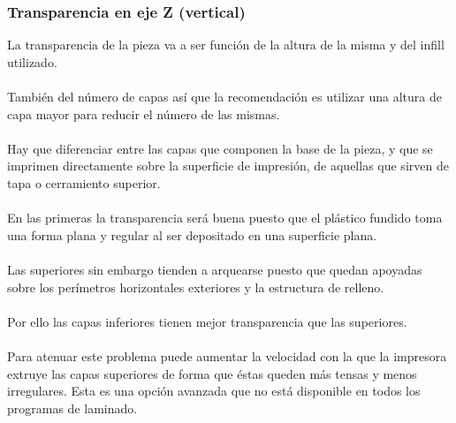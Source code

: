 \documentclass[11pt,a4paper]{article}
\begin{document}
		\subsubsection{Transparencia en eje Z (vertical)}La transparencia de la pieza va a ser función de la altura de la misma y del infill utilizado.
\\\\
También del número de capas así que la recomendación es utilizar una altura de capa mayor para reducir el número de las mismas.
\\\\
Hay que diferenciar entre las capas que componen la base de la pieza, y que se imprimen directamente sobre la superficie de impresión, de aquellas que sirven de tapa o cerramiento superior.
\\\\
En las primeras la transparencia será buena puesto que el plástico fundido toma una forma plana y regular al ser depositado en una superficie plana.
\\\\
Las superiores sin embargo tienden a arquearse puesto que quedan apoyadas sobre los perímetros horizontales exteriores y la estructura de relleno.
\\\\
Por ello las capas inferiores tienen mejor transparencia que las superiores.
\\\\
Para atenuar este problema puede aumentar la velocidad con la que la impresora extruye las capas superiores de forma que éstas queden más tensas y menos irregulares. Esta es una opción avanzada que no está disponible en todos los programas de laminado.
\end{document}
